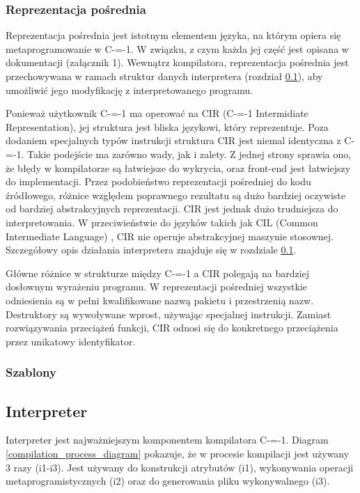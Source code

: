 \subsubsection{Reprezentacja pośrednia}
\label{implementation:intermidiate_representation}
Reprezentacja pośrednia jest istotnym elementem języka, na którym opiera się metaprogramowanie w C-=-1.
W związku, z czym każda jej część jest opisana w dokumentacji (załącznik 1).
Wewnątrz kompilatora, reprezentacja pośrednia jest przechowywana w ramach struktur danych interpretera (rozdział \ref{interpreter}), aby umożliwić jego modyfikację z interpretowanego programu.

Ponieważ użytkownik C-=-1 ma operować na CIR (C-=-1 Intermidiate Representation), jej struktura jest bliska językowi, który reprezentuje. 
Poza dodaniem specjalnych typów instrukcji struktura CIR jest niemal identyczna z C-=-1.
Takie podejście ma zarówno wady, jak i zalety. 
Z jednej strony sprawia ono, że błędy w kompilatorze są łatwiejsze do wykrycia, oraz front-end jest łatwiejszy do implementacji.
Przez podobieństwo reprezentacji pośredniej do kodu źródłowego, różnice względem poprawnego rezultatu są dużo bardziej oczywiste od bardziej abstrakcyjnych reprezentacji.
CIR jest jednak dużo trudniejsza do interpretowania.
W przeciwieństwie do języków takich jak CIL (Common Intermediate Language) \cite{ecma:cli}, CIR nie operuje abstrakcyjnej maszynie stosownej.
Szczegółowy opis działania interpretera znajduje się w rozdziale \ref{interpreter}.

Główne różnice w strukturze między C-=-1 a CIR polegają na bardziej dosłownym wyrażeniu programu. W reprezentacji pośredniej wszystkie odniesienia są w pełni kwalifikowane nazwą pakietu i przestrzenią nazw. Destruktory są wywoływane wprost, używając specjalnej instrukcji. Zamiast rozwiązywania przeciążeń funkcji, CIR odnosi się do konkretnego przeciążenia przez unikatowy identyfikator.

\subsubsection{Szablony}
\label{implementation:generics}



\subsection{Interpreter}
\label{interpreter}

Interpreter jest najważniejszym komponentem kompilatora C-=-1.
Diagram \ref{compilation_process_diagram} pokazuje, że w procesie kompilacji jest używany 3 razy (i1-i3).
Jest używany do konstrukcji atrybutów (i1), wykonywania operacji metaprogramistycznych (i2) oraz do generowania pliku wykonywalnego (i3).

